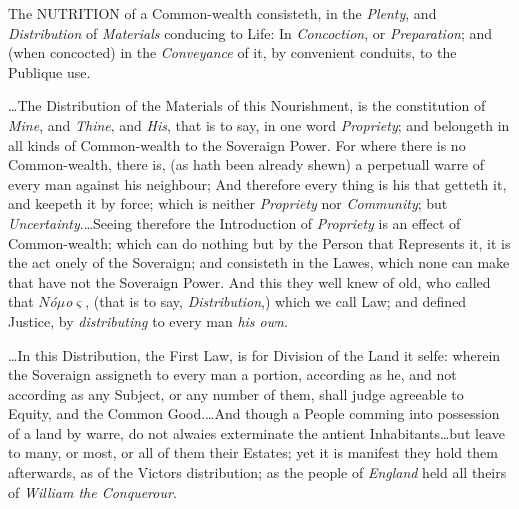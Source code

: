 
The NUTRITION of a Common-wealth consisteth, in the \textit{Plenty}, and
\textit{Distribution} of \textit{Materials} conducing to Life: In
\textit{Concoction}, or \textit{Preparation}; and (when concocted) in the
\textit{Conveyance} of it, by convenient conduits, to the Publique use.

\ldots The Distribution of the Materials of this Nourishment, is the
constitution of \textit{Mine}, and \textit{Thine}, and \textit{His}, that is to
say, in one word \textit{Propriety}; and belongeth in all kinds of Common-wealth
to the Soveraign Power. For where there is no Common-wealth, there is, (as hath
been already shewn) a perpetuall warre of every man against his neighbour; And
therefore every thing is his that getteth it, and keepeth it by force; which is
neither \textit{Propriety} nor \textit{Community}; but
\textit{Uncertainty}.\ldots Seeing therefore the Introduction of
\textit{Propriety} is an effect of Common-wealth; which can do nothing but by
the Person that Represents it, it is the act onely of the Soveraign; and
consisteth in the Lawes, which none can make that have not the Soveraign Power.
And this they well knew of old, who called that \textit{$N$\'o$\mu $o$\varsigma
$}, (that is to say, \textit{Distribution},) which we call Law; and defined
Justice, by \textit{distributing} to every man \textit{his own}. 

\ldots In this Distribution, the First Law, is for Division of the Land it
selfe: wherein the Soveraign assigneth to every man a portion, according as he,
and not according as any Subject, or any number of them, shall judge agreeable
to Equity, and the Common Good.\ldots And though a People comming into
possession of a land by warre, do not alwaies exterminate the antient
Inhabitants\ldots but leave to many, or most, or all of them their Estates; yet
it is manifest they hold them afterwards, as of the Victors distribution; as the
people of \textit{England} held all theirs of \textit{William the Conquerour}.


